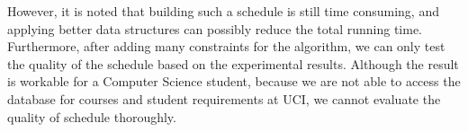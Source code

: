 \documentclass[letterpaper,12pt]{article}
\theoremstyle{definition}
\begin{document}
However, it is noted that building such a schedule is still time consuming, and applying better data structures can possibly reduce the total running time. Furthermore, after adding many constraints for the algorithm, we can only test the quality of the schedule based on the experimental results. Although the result is workable for a Computer Science student, because we are not able to access the database for courses and student requirements at UCI, we cannot evaluate the quality of schedule thoroughly.


\newpage


\end{document}
